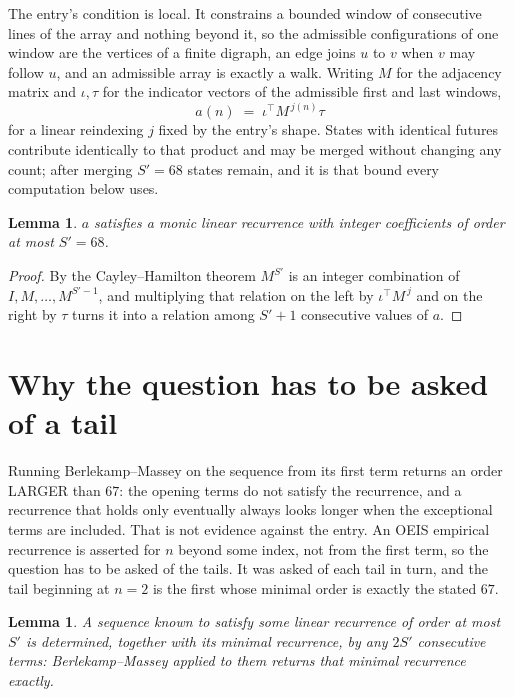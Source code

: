 \documentclass[11pt,a4paper]{article}
\theoremstyle{plain}
\newtheorem{lemma}[theorem]{Lemma}
\theoremstyle{definition}
\begin{document}
The entry's condition is local. It constrains a bounded window of consecutive lines of the
array and nothing beyond it, so the admissible configurations of one window are the vertices of
a finite digraph, an edge joins $u$ to $v$ when $v$ may follow $u$, and an admissible array is
exactly a walk. Writing $M$ for the adjacency matrix and $\iota,\tau$ for the indicator vectors
of the admissible first and last windows,
\[
a(n)\;=\;\iota^{\!\top}M^{\,j(n)}\tau
\]
for a linear reindexing $j$ fixed by the entry's shape. States with identical futures
contribute identically to that product and may be merged without changing any count; after
merging $S'=68$ states remain, and it is that bound every computation below uses.

\begin{lemma}\label{lem:cf}
$a$ satisfies a monic linear recurrence with integer coefficients of order at most $S'=68$.
\end{lemma}

\begin{proof}
By the Cayley--Hamilton theorem $M^{S'}$ is an integer combination of $I,M,\dots,M^{S'-1}$,
and multiplying that relation on the left by $\iota^{\!\top}M^{\,j}$ and on the right by
$\tau$ turns it into a relation among $S'+1$ consecutive values of $a$.
\end{proof}

\section{Why the question has to be asked of a tail}

Running Berlekamp--Massey on the sequence from its first term returns an order LARGER than $67$: the opening terms do not satisfy the recurrence, and a recurrence that holds only eventually always looks longer when the exceptional terms are included. That is not evidence against the entry. An OEIS empirical recurrence is asserted for $n$ beyond some index, not from the first term, so the question has to be asked of the tails. It was asked of each tail in turn, and the tail beginning at $n=2$ is the first whose minimal order is exactly the stated $67$.

\begin{lemma}\label{lem:bm}
A sequence known to satisfy some linear recurrence of order at most $S'$ is determined,
together with its minimal recurrence, by any $2S'$ consecutive terms: Berlekamp--Massey applied
to them returns that minimal recurrence exactly.
\end{lemma}
\end{document}
